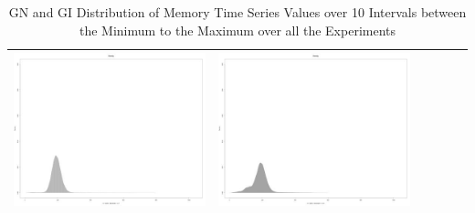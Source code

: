 \begin{table}[htbp]
{\begin{tabular}{l | ccccc}
\begin{minipage}{.15\textwidth}
     			 	\includegraphics[width=\linewidth]{images/mema-dens-graph/I14}
    				 \end{minipage}
    			   &	 \begin{minipage}{.15\textwidth}
     			 	\includegraphics[width=\linewidth]{images/mema-dens-graph/I15}
    				 \end{minipage}\\
		\hline %
	 \end{tabular}
	}
	\caption[\textsc{Analyser} Investigation Stack - Level 2 - Pattern Identification - Memory Distribution - Baselines GN and GI]{GN and GI Distribution of Memory Time Series Values over 10 Intervals between the Minimum to the Maximum over all the Experiments} 
	\label{tab:level2-memory-density-graph}
	\end{table}